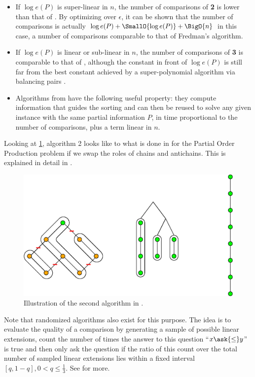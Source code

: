\begin{itemize}

\item If $\log e(P)$ is super-linear in $n$, the number of comparisons of
\cite{cardinal2013sorting} \textbf{2} is lower than that of \cite{kahnkim1}. By
optimizing over $\epsilon$, it can be shown that the number of comparisons is
actually $\log e(P) + \SmallO{\log e(P)} + \BigO{n}$ in this case, a number of
comparisons comparable to that of Fredman’s algorithm.

\item If $\log e(P)$ is linear or sub-linear in $n$, the number of comparisons
of \cite{cardinal2013sorting} \textbf{3} is comparable to that of
\cite{kahnkim1}, although the constant in front of $\log e(P)$ is still far
from the best constant achieved by a super-polynomial algorithm via balancing
pairs \cite{brightwell1995balancing, brightwell1999balanced}.

\item Algorithms from \cite{cardinal2013sorting} have the following useful
property: they compute information that guides the sorting and can then be
reused to solve any given instance with the same partial information $P$, in
time proportional to the number of comparisons, plus a term linear in $n$.

\end{itemize}


Looking at \ref{fig:supi/alg2}, algorithm 2 looks like to what is done in
\cite{jcardin1} for the Partial Order Production problem if we swap the roles
of chains and antichains. This is explained in detail in
\cite{DBLP:conf/birthday/CardinalF13}.


\begin{figure}
	\centering
	\includegraphics[height=0.2\textheight]{fig/supi/reduction:diag}
	\caption{\label{fig:supi/alg2} Illustration of the second algorithm in
\cite{cardinal2013sorting}.}
\end{figure}


Note that randomized algorithms also exist for this purpose. The idea is to
evaluate the quality of a comparison by generating a sample of possible linear
extensions, count the number of times the answer to this question ``$x
\ask{\le} y$'' is true and then only ask the question if the ratio of
this count over the total number of sampled linear extensions lies within a
fixed interval $[q, 1-q], 0 < q \le \frac{1}{3}$. See \cite{huber2006fast} for
more.

